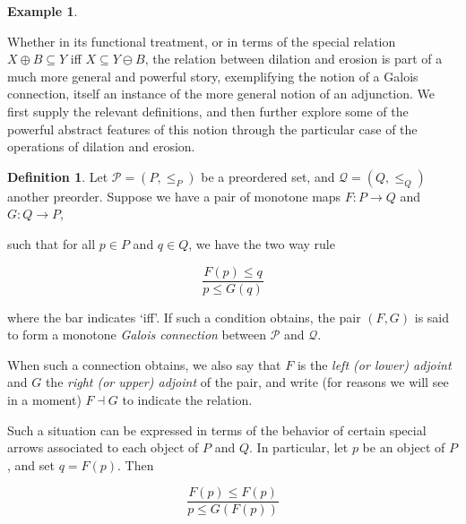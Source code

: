 \documentclass[11pt]{book}
\theoremstyle{definition}
\newtheorem{example}{Example}[section]
\theoremstyle{definition}
\newtheorem{definition}{Definition}[section]
\theoremstyle{definition}
\theoremstyle{theorem}
\theoremstyle{definition}
\begin{document}
\begin{example}
\begin{center}
\end{center}
Whether in its functional treatment, or in terms of the special relation $X \oplus B \subseteq  Y$ iff $X \subseteq  Y \ominus B$, the relation between dilation and erosion is part of a much more general and powerful story, exemplifying the notion of a Galois connection, itself an instance of the more general notion of an adjunction. We first supply the relevant definitions, and then further explore some of the powerful abstract features of this notion through the particular case of the operations of dilation and erosion. 
\begin{definition} 
Let $\mathcal{P} = (P, \leq_P)$ be a preordered set, and $\mathcal{Q} = (Q, \leq_Q)$ another preorder. Suppose we have a pair of monotone maps $F: P \rightarrow Q$ and $G: Q \rightarrow P$, 
\begin{center}  
\end{center} 
such that for all $p \in P$ and $q \in Q$, we have the two way rule 
\begin{center} 
	\begin{equation*}
	\frac{F(p) \leq q}{p \leq G(q)}
	\end{equation*}
\end{center} 
where the bar indicates `iff'. If such a condition obtains, the pair $(F, G)$ is said to form a monotone \textit{Galois connection} between $\mathcal{P}$ and $\mathcal{Q}$. 
\end{definition} \noindent 
When such a connection obtains, we also say that $F$ is the \textit{left (or lower) adjoint} and $G$ the \textit{right (or upper) adjoint} of the pair, and write (for reasons we will see in a moment) $F \dashv G$ to indicate the relation. \par 
Such a situation can be expressed in terms of the behavior of certain special arrows associated to each object of $P$ and $Q$. In particular, let $p$ be an object of $P$, and set $q = F(p)$. Then 
\begin{center} 
	\begin{equation*}
	\frac{F(p) \leq F(p)}{p \leq G(F(p))}
	\end{equation*}
\end{center} 

\end{example}
\end{document}
